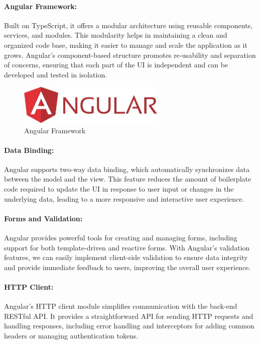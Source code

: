\documentclass[12pt,a4paper,table,english]{article}
\begin{document}
	
	\paragraph{Angular Framework:}
	Built on TypeScript, it offers a modular architecture using reusable components, services, and modules. This modularity helps in maintaining a clean and organized code base, making it easier to manage and scale the application as it grows. Angular’s component-based structure promotes re-usability and separation of concerns, ensuring that each part of the UI is independent and can be developed and tested in isolation.
	
			
	\begin{figure}[H]
		\centering
		\includegraphics[width=70mm]{Image/angular}
		\caption{Angular Framework}
		\label{fig:Angular Framework}
	\end{figure}
	\newpage
	\paragraph{Data Binding:}
	Angular supports two-way data binding, which automatically synchronizes data between the model and the view. This feature reduces the amount of boilerplate code required to update the UI in response to user input or changes in the underlying data, leading to a more responsive and interactive user experience.
	
	\paragraph{Forms and Validation:}
	Angular provides powerful tools for creating and managing forms, including support for both template-driven and reactive forms. With Angular's validation features, we can easily implement client-side validation to ensure data integrity and provide immediate feedback to users, improving the overall user experience.
	
	\paragraph{HTTP Client:}
	Angular’s HTTP client module simplifies communication with the back-end RESTful API. It provides a straightforward API for sending HTTP requests and handling responses, including error handling and interceptors for adding common headers or managing authentication tokens.
	
\end{document}
